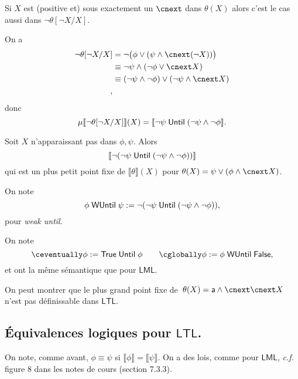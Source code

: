 \documentclass[./main]{subfiles}
\begin{document}
  \begin{rmk}
    Si $X$ est (positive et) sous exactement un $\nxt$ dans  $\theta(X)$ alors c'est le cas aussi dans  $\lnot \theta[\lnot X / X]$.

    On a 
    \begin{align*}
      \lnot \theta[\lnot X / X] &= \lnot \big(\phi \lor (\psi \land \nxt (\lnot X)) \big)\\
      &\equiv \lnot \psi \land (\lnot \phi \lor \nxt X)  \\
      &\equiv(\lnot \psi \land \lnot \phi) \lor (\lnot \psi \land \nxt X) \\
    ,\end{align*}
    donc 
    \[
      \mu\llbracket \lnot \theta[\lnot X / X] \rrbracket (X) = \llbracket \lnot \psi \mathrel{\mathsf{Until}} (\lnot \psi \land \lnot \phi\rrbracket  
    .\]
  \end{rmk}

  \begin{lem}
    Soit $X$ n'apparaissant pas dans $\phi, \psi$.
    Alors
    \[
    \llbracket \lnot (\lnot \psi \mathrel{\mathsf{Until}} (\lnot \psi \land \lnot \phi)) \rrbracket  
    \] qui est un plus petit point fixe de $\llbracket \theta\rrbracket(X)$ pour $\theta(X) = \psi \lor (\phi \land \nxt X)$.
  \end{lem}

  \begin{nota}
    On note 
    \[
    \phi \mathrel{\mathsf{WUntil}} \psi := \lnot (\lnot \psi \mathrel{\mathsf{Until}} (\lnot \psi \land \lnot \phi))
    ,\] 
    pour \textit{weak until}.
  \end{nota}

  \begin{nota}
    On note
    \[
    \eventually \phi := \mathsf{True} \until \phi \quad\quad \always \phi := \phi \wuntil \mathsf{False}
    ,\] 
    et ont la même sémantique que pour $\mathsf{LML}$.
  \end{nota}

  \begin{rmk}
    On peut montrer que le plus grand point fixe de~$\theta(X) = \mathsf{a} \land \nxt \nxt X$ n'est pas définissable dans $\mathsf{LTL}$.
  \end{rmk}

  \subsection{Équivalences logiques pour $\mathsf{LTL}$.}
  On note, comme avant, $\phi \equiv \psi$ si $\llbracket \phi\rrbracket = \llbracket \psi\rrbracket$.
  On a des lois, comme pour $\mathsf{LML}$, \textit{c.f.} figure 8 dans les notes de cours (section 7.3.3).
\end{document}
